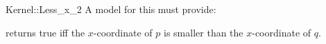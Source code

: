 \begin{ccRefFunctionObjectConcept}{Kernel::Less_x_2}
A model for this must provide:


{returns true iff the $x$-coordinate of $p$ is smaller than the
$x$-coordinate of $q$.}

\ccIsModel{}

\end{ccRefFunctionObjectConcept}
